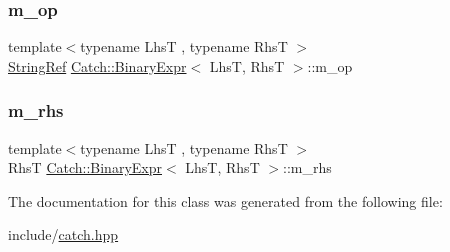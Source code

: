 \subsubsection{\texorpdfstring{m\_op}{m\_op}}
{\footnotesize\ttfamily template$<$typename LhsT , typename RhsT $>$ \\
\mbox{\hyperlink{class_catch_1_1_string_ref}{String\+Ref}} \mbox{\hyperlink{class_catch_1_1_binary_expr}{Catch\+::\+Binary\+Expr}}$<$ LhsT, RhsT $>$\+::m\+\_\+op\hspace{0.3cm}{\ttfamily [private]}}

\mbox{\label{class_catch_1_1_binary_expr_a54cb1629bf304ebe0c1560f4cc2bc186}} 
\subsubsection{\texorpdfstring{m\_rhs}{m\_rhs}}
{\footnotesize\ttfamily template$<$typename LhsT , typename RhsT $>$ \\
RhsT \mbox{\hyperlink{class_catch_1_1_binary_expr}{Catch\+::\+Binary\+Expr}}$<$ LhsT, RhsT $>$\+::m\+\_\+rhs\hspace{0.3cm}{\ttfamily [private]}}



The documentation for this class was generated from the following file\+:\begin{DoxyCompactItemize}
\item 
include/\mbox{\hyperlink{catch_8hpp}{catch.\+hpp}}\end{DoxyCompactItemize}
